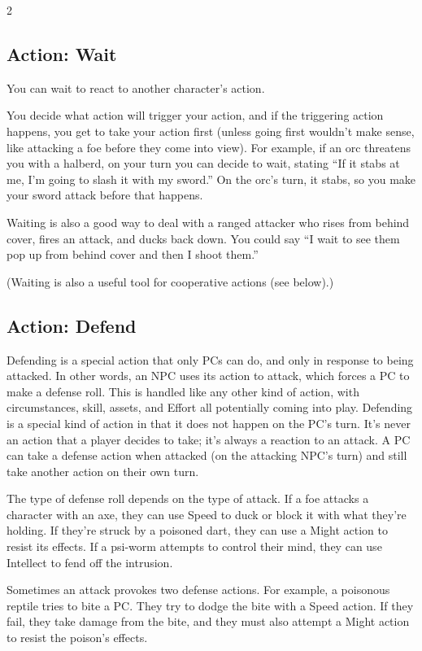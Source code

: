 \begin{multicols}{2}
\subsection{Action: Wait}

You can wait to react to another character’s action.

You decide what action will trigger your action, and if the triggering action happens, you get to take your action first (unless going first wouldn’t make sense, like attacking a foe before they come into view). For example, if an orc threatens you with a halberd, on your turn you can decide to wait, stating “If it stabs at me, I’m going to slash it with my sword.” On the orc’s turn, it stabs, so you make your sword attack before that happens.

Waiting is also a good way to deal with a ranged attacker who rises from behind cover, fires an attack, and ducks back down. You could say “I wait to see them pop up from behind cover and then I shoot them.”

(Waiting is also a useful tool for cooperative actions (see below).)

\subsection{Action: Defend}

Defending is a special action that only PCs can do, and only in response to being attacked. In other words, an NPC uses its action to attack, which forces a PC to make a defense roll. This is handled like any other kind of action, with circumstances, skill, assets, and Effort all potentially coming into play. Defending is a special kind of action in that it does not happen on the PC’s turn. It’s never an action that a player decides to take; it’s always a reaction to an attack. A PC can take a defense action when attacked (on the attacking NPC’s turn) and still take another action on their own turn.

The type of defense roll depends on the type of attack. If a foe attacks a character with an axe, they can use Speed to duck or block it with what they’re holding. If they’re struck by a poisoned dart, they can use a Might action to resist its effects. If a psi-worm attempts to control their mind, they can use Intellect to fend off the intrusion.

Sometimes an attack provokes two defense actions. For example, a poisonous reptile tries to bite a PC. They try to dodge the bite with a Speed action. If they fail, they take damage from the bite, and they must also attempt a Might action to resist the poison’s effects.


\end{multicols}
